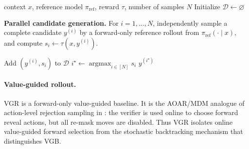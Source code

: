 \documentclass{article}
\numberwithin{theorem}{section}
\numberwithin{proposition}{section}
\numberwithin{corollary}{section}
\numberwithin{lemma}{section}
\numberwithin{conjecture}{section}
\numberwithin{remark}{section}
\numberwithin{definition}{section}
\numberwithin{assumption}{section}
\numberwithin{example}{section}
\newcommand{\lbra}[1]{\left[#1\right]}
\providecommand{\base}{\pi_{\mathrm{ref}}}
\DeclareMathOperator*{\argmax}{argmax}
\begin{document}
\begin{algorithm}[h!]
\caption[Best-of-$N$ with terminal verifier (BoN)]{Best-of-$N$ with terminal verifier (BoN)
(\protect{} = parallelizable area)}
\label{alg:bon}
\begin{algorithmic}[1]
\Require context $x$, reference model $\base$, reward $\tau$, number of samples $N$
\State Initialize $\mathcal D\gets\varnothing$
\Statex \hspace*{\algorithmicindent}\colorbox{Lavender!25}{
\parbox{0.86\linewidth}{
\textbf{Parallel candidate generation.}
For $i=1,\dots,N$, independently sample a complete candidate
$y^{(i)}$ by a forward-only reference rollout from $\base(\cdot\mid x)$,
and compute $s_i\gets\tau(x,y^{(i)})$.}}
    \State Add $(y^{(i)},s_i)$ to $\mathcal D$
\EndFor
\State $i^\star\gets \argmax_{i\in\lbra{N}}s_i$
\State \Return $y^{(i^\star)}$
\end{algorithmic}
\end{algorithm}

\paragraph{Value-guided rollout.}
\textsc{VGR} is a forward-only value-guided baseline. It is the AOAR/MDM
analogue of action-level rejection sampling in \citet{rohatgi2025taming}: the
verifier is used online to choose forward reveal actions, but all
re-mask moves are disabled. Thus \textsc{VGR} isolates online value-guided
forward selection from the stochastic backtracking mechanism that distinguishes
VGB.
\end{document}
